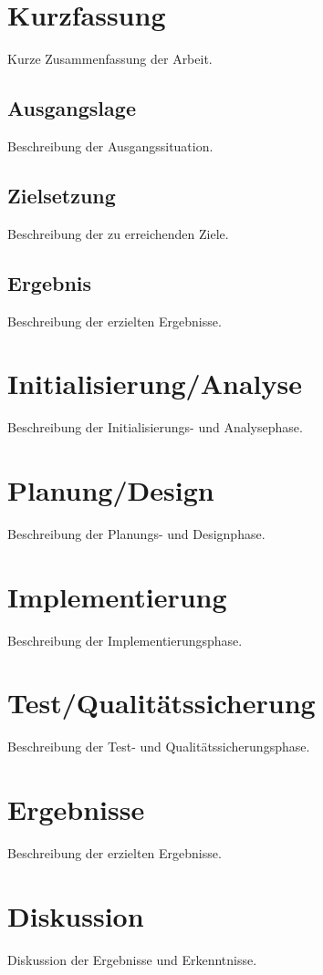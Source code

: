 
\chapter{Kurzfassung}
Kurze Zusammenfassung der Arbeit.

\section{Ausgangslage}
Beschreibung der Ausgangssituation.

\section{Zielsetzung}
Beschreibung der zu erreichenden Ziele.

\section{Ergebnis}
Beschreibung der erzielten Ergebnisse. 

\chapter{Initialisierung/Analyse}
Beschreibung der Initialisierungs- und Analysephase.

\chapter{Planung/Design}
Beschreibung der Planungs- und Designphase.

\chapter{Implementierung}
Beschreibung der Implementierungsphase.

\chapter{Test/Qualitätssicherung}
Beschreibung der Test- und Qualitätssicherungsphase.
 
\chapter{Ergebnisse}
Beschreibung der erzielten Ergebnisse.

\chapter{Diskussion}
Diskussion der Ergebnisse und Erkenntnisse. 